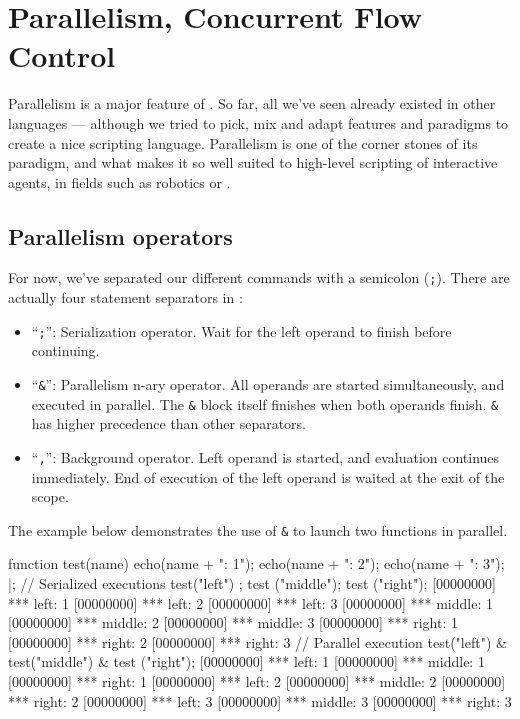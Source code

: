 \chapter{Parallelism, Concurrent Flow Control}
\label{sec:tut:concurrent}

Parallelism is a major feature of \us. So far, all we've
seen already existed in other languages --- although we tried to pick,
mix and adapt features and paradigms to create a nice scripting
language. Parallelism is one of the corner stones of its paradigm, and
what makes it so well suited to high-level scripting of interactive
agents, in fields such as robotics or \ai.

\section{Parallelism operators}

For now, we've separated our different commands with a semicolon
(\lstinline{;}). There are actually four statement separators in \us:

\begin{itemize}
\item ``\lstinline{;}'': Serialization operator. Wait for the left
  operand to finish before continuing.
\item ``\lstinline{&}'': Parallelism n-ary operator. All operands are
  started simultaneously, and executed in parallel. The \lstinline{&}
  block itself finishes when both operands finish. \lstinline{&} has
  higher precedence than other separators.
\item ``\lstinline{,}'': Background operator. Left operand is started,
  and evaluation continues immediately. End of execution of the left
  operand is waited at the exit of the scope.
\end{itemize}

The example below demonstrates the use of \lstinline{&} to launch two
functions in parallel.

\begin{urbiscript}[firstnumber=1]
function test(name)
{
  echo(name + ": 1");
  echo(name + ": 2");
  echo(name + ": 3");
} |;
// Serialized executions
test("left") ; test ("middle"); test ("right");
[00000000] *** left: 1
[00000000] *** left: 2
[00000000] *** left: 3
[00000000] *** middle: 1
[00000000] *** middle: 2
[00000000] *** middle: 3
[00000000] *** right: 1
[00000000] *** right: 2
[00000000] *** right: 3
// Parallel execution
test("left") & test("middle") & test ("right");
[00000000] *** left: 1
[00000000] *** middle: 1
[00000000] *** right: 1
[00000000] *** left: 2
[00000000] *** middle: 2
[00000000] *** right: 2
[00000000] *** left: 3
[00000000] *** middle: 3
[00000000] *** right: 3
\end{urbiscript}

